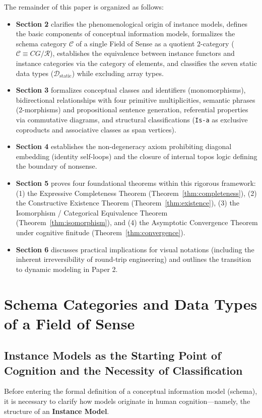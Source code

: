 \documentclass[11pt,a4paper]{article}
\theoremstyle{definition}
\theoremstyle{plain}
\theoremstyle{remark}
\newcommand{\Dstatic}{\mathcal{D}_{\mathrm{static}}}
\begin{document}
The remainder of this paper is organized as follows:
\begin{itemize}
    \item \textbf{Section 2} clarifies the phenomenological origin of instance models, defines the basic components of conceptual information models, formalizes the schema category $\mathcal{C}$ of a single Field of Sense as a quotient 2-category ($\mathcal{C} \equiv CG/\mathcal{R}$), establishes the equivalence between instance functors and instance categories via the category of elements, and classifies the seven static data types ($\Dstatic$) while excluding array types.
    \item \textbf{Section 3} formalizes conceptual classes and identifiers (monomorphisms), bidirectional relationships with four primitive multiplicities, semantic phrases (2-morphisms) and propositional sentence generation, referential properties via commutative diagrams, and structural classifications (\texttt{Is-a} as exclusive coproducts and associative classes as span vertices).
    \item \textbf{Section 4} establishes the non-degeneracy axiom prohibiting diagonal embedding (identity self-loops) and the closure of internal topos logic defining the boundary of nonsense.
    \item \textbf{Section 5} proves four foundational theorems within this rigorous framework: (1) the Expressive Completeness Theorem (Theorem~\ref{thm:completeness}), (2) the Constructive Existence Theorem (Theorem~\ref{thm:existence}), (3) the Isomorphism / Categorical Equivalence Theorem (Theorem~\ref{thm:isomorphism}), and (4) the Asymptotic Convergence Theorem under cognitive finitude (Theorem~\ref{thm:convergence}).
    \item \textbf{Section 6} discusses practical implications for visual notations (including the inherent irreversibility of round-trip engineering) and outlines the transition to dynamic modeling in Paper 2.
\end{itemize}

\section{Schema Categories and Data Types of a Field of Sense}

\subsection{Instance Models as the Starting Point of Cognition and the Necessity of Classification}
Before entering the formal definition of a conceptual information model (schema), it is necessary to clarify how models originate in human cognition---namely, the structure of an \textbf{Instance Model}.
\end{document}
